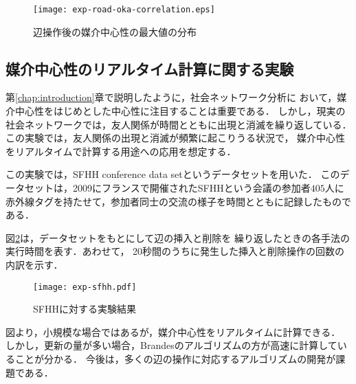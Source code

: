 \begin{figure}[tb]
  \centering
  \texttt{[image: exp-road-oka-correlation.eps]}
  \caption{辺操作後の媒介中心性の最大値の分布}
  \label{fig:exp-road-oka-correlation}
\end{figure}

\subsection{媒介中心性のリアルタイム計算に関する実験}
\label{subsect:exp-sfhh}

第\ref{chap:introduction}章で説明したように，社会ネットワーク分析に
おいて，媒介中心性をはじめとした中心性に注目することは重要である．
しかし，現実の社会ネットワークでは，友人関係が時間とともに出現と消滅を繰り返している．
この実験では，友人関係の出現と消滅が頻繁に起こりうる状況で，
媒介中心性をリアルタイムで計算する用途への応用を想定する．

この実験では，SFHH conference data set\cite{Genois2018}というデータセットを用いた．
このデータセットは，2009にフランスで開催されたSFHHという会議の参加者$405$人に
赤外線タグを持たせて，参加者同士の交流の様子を時間とともに記録したものである．

図\ref{fig:exp-sfhh}は，データセットをもとにして辺の挿入と削除を
繰り返したときの各手法の実行時間を表す．あわせて，
20秒間のうちに発生した挿入と削除操作の回数の内訳を示す．

\begin{figure}[tb]
  \centering
  \texttt{[image: exp-sfhh.pdf]}
  \caption{SFHHに対する実験結果}
  \label{fig:exp-sfhh}
\end{figure}

図より，小規模な場合ではあるが，媒介中心性をリアルタイムに計算できる．
しかし，更新の量が多い場合，Brandesのアルゴリズムの方が高速に計算していることが分かる．
今後は，多くの辺の操作に対応するアルゴリズムの開発が課題である．
